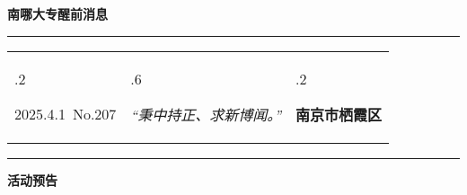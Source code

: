 \documentclass[letterpaper, 12pt]{article}
\begin{document}
\begin{center}
    \Huge\textbf{南哪大专醒前消息}
\end{center}
\vspace{4mm}
\hrule
\renewcommand\tabularxcolumn[1]{m{#1}}
\begin{tabularx}{\textwidth}{>{\hsize.2\hsize}X>{\hsize.6\hsize}X>{\hsize.2\hsize}X}
    \begin{flushleft}
        2025.4.1\, No.207
    \end{flushleft}
    &
    \begin{center}
        \textit{“秉中持正、求新博闻。”}
    \end{center}
    &
    \begin{flushright}
        \textbf{南京市栖霞区}
    \end{flushright}
\end{tabularx}
\vspace{-3.5mm}
\hrule
\vspace{4mm}
\centerline{\huge\textbf{活动预告}}
\end{document}
